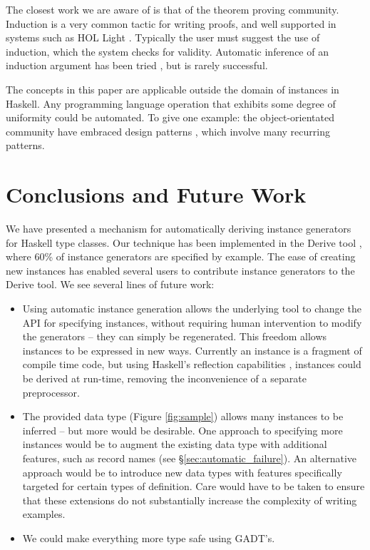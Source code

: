 \documentclass[preprint]{sigplanconf}
\begin{document}
The closest work we are aware of is that of the theorem proving community. Induction is a very common tactic for writing proofs, and well supported in systems such as HOL Light \cite{hol_light}. Typically the user must suggest the use of induction, which the system checks for validity. Automatic inference of an induction argument has been tried \cite{mintchev:reasoning}, but is rarely successful.

The concepts in this paper are applicable outside the domain of instances in Haskell. Any programming language operation that exhibits some degree of uniformity could be automated. To give one example: the object-orientated community have embraced design patterns \cite{design_patterns}, which involve many recurring patterns.

\section{Conclusions and Future Work}
\label{sec:conclusion}

We have presented a mechanism for automatically deriving instance generators for Haskell type classes. Our technique has been implemented in the Derive tool \cite{derive}, where 60\% of instance generators are specified by example. The ease of creating new instances has enabled several users to contribute instance generators to the Derive tool. We see several lines of future work:

\begin{itemize}
\item Using automatic instance generation allows the underlying tool to change the API for specifying instances, without requiring human intervention to modify the generators -- they can simply be regenerated. This freedom allows instances to be expressed in new ways. Currently an instance is a fragment of compile time code, but using Haskell's reflection capabilities \cite{lammel:syb2}, instances could be derived at run-time, removing the inconvenience of a separate preprocessor.
\item The provided data type (Figure \ref{fig:sample}) allows many instances to be inferred -- but more would be desirable. One approach to specifying more instances would be to augment the existing data type with additional features, such as record names (see \S\ref{sec:automatic_failure}). An alternative approach would be to introduce new data types with features specifically targeted for certain types of definition. Care would have to be taken to ensure that these extensions do not substantially increase the complexity of writing examples.
\item We could make everything more type safe using GADT's.
\end{itemize}
\end{document}

